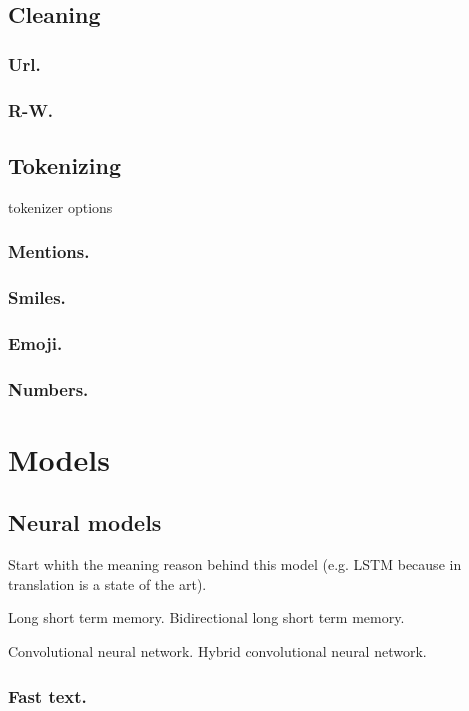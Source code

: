 \subsection{Cleaning}

\subsubsection{Url.}
\subsubsection{R-W.}

\subsection{Tokenizing}

tokenizer options

\subsubsection{Mentions.}
\subsubsection{Smiles.}
\subsubsection{Emoji.}
\subsubsection{Numbers.}


\section{Models}

 	

\subsection{Neural models}

Start whith the meaning reason behind this model (e.g. LSTM because in translation is a state of the art).

Long short term memory.
Bidirectional long short term memory.

Convolutional neural network.
Hybrid convolutional neural network.

\subsubsection{Fast text.}


